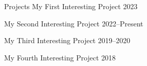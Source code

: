\documentclass{cv}
\begin{document}
\setpersonalsummary{\lipsum[1][1-5]} %
\cvheader

\begin{skills} %
	\faitem{\faCode} \lipsum[4][1]
	\faitem{\faLinux} \lipsum[4][2]
	\faitem{\faDatabase} \lipsum[4][3]
	\faitem{\faChartBar} \lipsum[4][4]
	\columnbreak
	\faitem{\faGit*} \lipsum[4][5]
	\faitem{\faProjectDiagram} \lipsum[4][6]
	\faitem{\faCogs} \lipsum[4][7]
	\faitem{\faCloud} \lipsum[4][8]
\end{skills}


\begin{career}
    { %
    \begin{careersection}{Projects}
        \careeritem
	{My First Interesting Project} %
        {2023} %
        {} %
        { %
        \begin{careeritemdetails}
	\item \lipsum[5][1-2] 
	\item \lipsum[5][3-4]
	\item \lipsum[5][4-5]
        \end{careeritemdetails}
        }
        \careeritem
	{My Second Interesting Project} %
        {2022--Present} %
        {} %
        { %
        \begin{careeritemdetails}
	\item \lipsum[6][1-2] 
	\item \lipsum[6][3-4]
	\item \lipsum[6][5-6]
        \end{careeritemdetails}
        }
        \careeritem
	{My Third Interesting Project} %
        {2019--2020} %
        {} %
        { %
        \begin{careeritemdetails}
	\item \lipsum[7][1-2] 
	\item \lipsum[7][3-4]
	\item \lipsum[7][5-6]
        \end{careeritemdetails}
        }
        \careeritem
	{My Fourth Interesting Project} %
        {2018} %
        {} %
        { %
        \begin{careeritemdetails}

\end{careeritemdetails}}
\end{careersection}}
\end{career}
\end{document}
